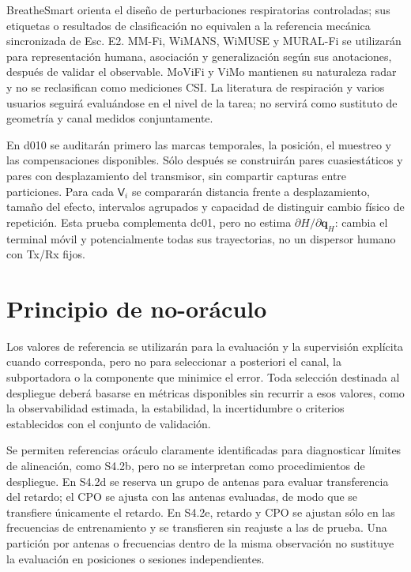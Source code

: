 BreatheSmart orienta el diseño de perturbaciones respiratorias controladas; sus
etiquetas o resultados de clasificación no equivalen a la referencia mecánica sincronizada
de Esc. E2. MM-Fi, WiMANS, WiMUSE y MURAL-Fi se utilizarán para representación humana,
asociación y generalización según sus anotaciones, después de validar el observable.
MoViFi y ViMo mantienen su naturaleza radar y no se reclasifican como mediciones CSI.
La literatura de respiración y varios usuarios seguirá evaluándose en el nivel de
la tarea; no servirá como sustituto de geometría y canal medidos conjuntamente.

En d010 se auditarán primero las marcas temporales, la posición, el muestreo y las
compensaciones disponibles. Sólo después se construirán pares cuasiestáticos y pares
con desplazamiento del transmisor, sin compartir capturas entre particiones. Para cada
$\mathsf V_i$ se compararán distancia frente a desplazamiento, tamaño del efecto,
intervalos agrupados y capacidad de distinguir cambio físico de repetición. Esta prueba
complementa dc01, pero no estima $\partial H/\partial\mathbf q_H$: cambia el terminal
móvil y potencialmente todas sus trayectorias, no un dispersor humano con Tx/Rx fijos.

\section{Principio de no-oráculo}

Los valores de referencia se utilizarán para la evaluación y la supervisión explícita cuando corresponda, pero no para seleccionar a posteriori el canal, la subportadora o la componente que minimice el error. Toda selección destinada al despliegue deberá basarse en métricas disponibles sin recurrir a esos valores, como la observabilidad estimada, la estabilidad, la incertidumbre o criterios establecidos con el conjunto de validación.

Se permiten referencias oráculo claramente identificadas para diagnosticar límites de alineación, como S4.2b, pero no se interpretan como procedimientos de despliegue. En S4.2d se reserva un grupo de antenas para evaluar transferencia del retardo; el CPO se ajusta con las antenas evaluadas, de modo que se transfiere únicamente el retardo. En S4.2e, retardo y CPO se ajustan sólo en las frecuencias de entrenamiento y se transfieren sin reajuste a las de prueba. Una partición por antenas o frecuencias dentro de la misma observación no sustituye la evaluación en posiciones o sesiones independientes.

